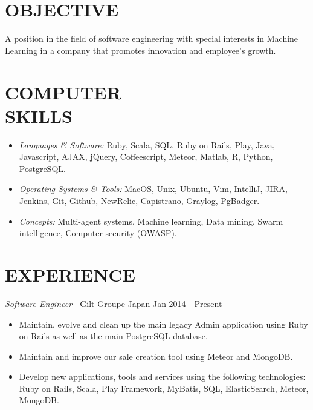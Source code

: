 \documentclass[line, margin]{res}
\begin{document}
\address{ 151-0051 Tokyo, Shibuya, Sendagaya 3-7-8 Urbanex Harajuku 605 }
\address{ abalonperin1@gmail.com | https://linkedin.com/in/abalonperin | https://github.com/zolrag13 }
 
\begin{resume}
 
\section{OBJECTIVE} A position in the field of software engineering with special interests in Machine Learning in a
company that promotes innovation and employee's growth. 
 
\section{COMPUTER \\ SKILLS}
                 \begin{itemize} %
                  \item {\sl Languages \& Software:} Ruby, Scala, SQL, Ruby on Rails, Play, Java, Javascript, AJAX, jQuery, Coffeescript, Meteor, Matlab, R, Python, PostgreSQL.
                  \item {\sl Operating Systems \& Tools:} MacOS, Unix, Ubuntu, Vim, IntelliJ, JIRA, Jenkins, Git,
                    Github, NewRelic, Capistrano, Graylog, PgBadger.
                  \item {\sl Concepts:} Multi-agent systems, Machine learning, Data mining, Swarm intelligence, Computer security (OWASP).
                \end{itemize}
 
\section{EXPERIENCE} {\sl Software Engineer} | Gilt Groupe Japan \hfill Jan 2014 - Present\\
                 \begin{itemize} %
                  \item  Maintain, evolve and clean up the main legacy Admin application using Ruby on Rails as well as the main PostgreSQL database.
                  \item  Maintain and improve our sale creation tool using Meteor and MongoDB.
                  \item  Develop new applications, tools and services using the following technologies: Ruby on Rails, Scala, Play Framework, MyBatis, SQL, ElasticSearch, Meteor, MongoDB.
                 \end{itemize}
 

\end{resume}
\end{document}
